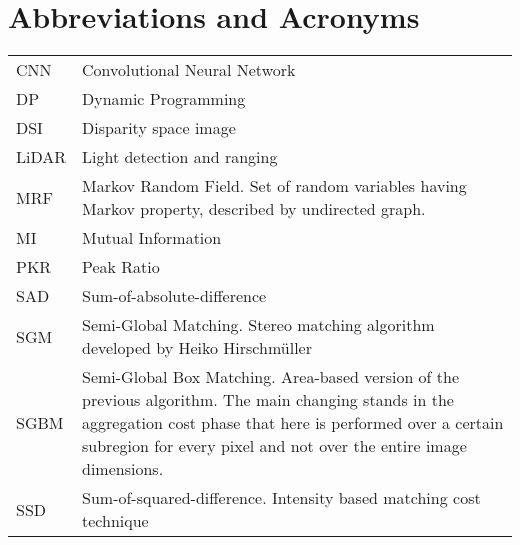 \chapter*{Abbreviations and Acronyms}


\noindent
\begin{longtable}{@{}p{}p{}@{}}
CNN & Convolutional Neural Network \\
DP & Dynamic Programming \\
DSI & Disparity space image \\
LiDAR & Light detection and ranging \\
MRF & Markov Random Field. Set of random variables having Markov property, described by undirected graph. \\ 
MI & Mutual Information \\
PKR & Peak Ratio \\
SAD & Sum-of-absolute-difference \\
SGM & Semi-Global Matching. Stereo matching algorithm developed by Heiko Hirschm\"{u}ller \\
SGBM & Semi-Global Box Matching. Area-based version of the previous algorithm. The main changing stands in the aggregation cost phase that here is performed over a certain subregion for every pixel and not over the entire image dimensions.\\
SSD & Sum-of-squared-difference. Intensity based matching cost technique\\
\end{longtable}
